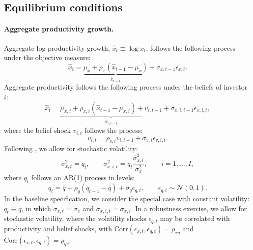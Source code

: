 \subsection{Equilibrium conditions}

\paragraph{Aggregate productivity growth.} Aggregate log productivity growth, $\hat{x}_t \equiv \log x_t$, follows the following process under the objective measure:
\begin{equation}
    \hat{x}_t = \underbrace{\mu_x + \rho_x (\hat{x}_{t-1}-\mu_x)}_{\overline{x}_{t-1}} + \sigma_{x,t-1}\epsilon_{x,t}.
\end{equation}
Aggregate productivity follows the following process under the beliefs of investor $i$:
\begin{equation}
    \hat{x}_t =  \underbrace{\mu_{x,i} + \rho_{x,i} (\hat{x}_{t-1}-\mu_{x,i}) + v_{i,t-1}}_{\overline{x}_{i,t-1}} + \sigma_{x,i,t-1}\epsilon_{x,i,t},
\end{equation}
where the belief shock $v_{i,t}$ follows the process:
\begin{equation}
    v_{i,t} = \rho_{v,i} v_{i,t-1} + \sigma_{v,i} \epsilon_{v,i,t}.
\end{equation}
\noindent Following \citet{bansal2004risks}, we allow for stochastic volatility:
\begin{equation}
    \sigma_{x,t}^2 = q_t,
    \qquad
    \sigma_{x,i,t}^2 = q_t\frac{\overline{\sigma}_{x,i}^2}{\overline{\sigma}_x^2},
    \qquad i=1,\ldots,I,
\end{equation}
where \(q_t\) follows an AR(1) process in levels:
\begin{equation}
    q_t = \bar{q} + \rho_q(q_{t-1}-\bar{q}) + \sigma_q \epsilon_{q,t}, \qquad \epsilon_{q,t}\sim\mathcal{N}(0,1).
\end{equation}
In the baseline specification, we consider the special case with constant volatility: \(q_t\equiv \bar q\), in which \(\sigma_{x,t}=\overline{\sigma}_x\) and \(\sigma_{x,i,t}=\overline{\sigma}_{x,i}\).
In a robustness exercise, we allow for stochastic volatility, where the volatility shocks \(\epsilon_{q,t}\) may be correlated with productivity and belief shocks, with \(\text{Corr}(\epsilon_{x,t},\epsilon_{q,t})=\rho_{xq}\) and \(\text{Corr}(\epsilon_{v,t},\epsilon_{q,t})=\rho_{qv}\). 

